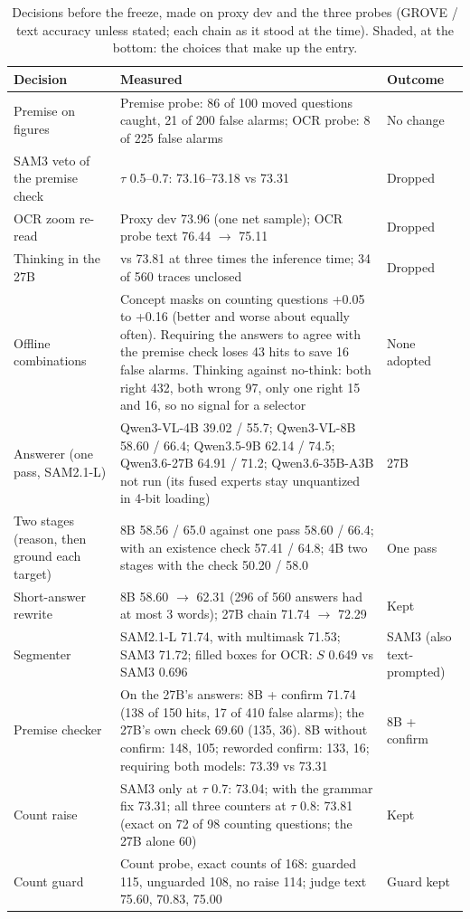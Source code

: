 \documentclass{article}
\newcommand{\ours}{\rowcolor{oursbg}}
\begin{document}
\begin{table}[!htbp]
\centering\scriptsize
\caption{Decisions before the freeze, made on proxy dev and the three probes (GROVE / text accuracy unless stated; each chain as it
stood at the time). Shaded, at the bottom: the choices that make up the entry.}
\label{tab:pre}
\begin{tabular}{@{}>{\raggedright\arraybackslash}p{1.15in}>{\raggedright\arraybackslash}p{3.4in}>{\raggedright\arraybackslash}p{.6in}@{}}
\toprule
Decision & Measured & Outcome \\
\midrule
Premise on figures & Premise probe: 86 of 100 moved questions caught, 21 of 200 false alarms; OCR probe: 8 of 225 false alarms & No change \\
SAM3 veto of the premise check & $\tau$ 0.5--0.7: 73.16--73.18 vs 73.31 & Dropped \\
OCR zoom re-read & Proxy dev 73.96 (one net sample); OCR probe text 76.44 $\to$ 75.11 & Dropped \\
Thinking in the 27B & 73.64 vs 73.81 at three times the inference time; 34 of 560 traces unclosed & Dropped \\
Offline combinations & Concept masks on counting questions +0.05 to +0.16 (better and worse about equally often). Requiring the answers to agree with the premise check loses 43 hits to save 16 false alarms. Thinking against no-think: both right 432, both wrong 97, only one right 15 and 16, so no signal for a selector & None adopted \\
\midrule
\ours Answerer (one pass, SAM2.1-L) & Qwen3-VL-4B 39.02 / 55.7; Qwen3-VL-8B 58.60 / 66.4; Qwen3.5-9B 62.14 / 74.5; Qwen3.6-27B 64.91 / 71.2; Qwen3.6-35B-A3B not run (its fused experts stay unquantized in 4-bit loading) & 27B \\
\ours Two stages (reason, then ground each target) & 8B 58.56 / 65.0 against one pass 58.60 / 66.4; with an existence check 57.41 / 64.8; 4B two stages with the check 50.20 / 58.0 & One pass \\
\ours Short-answer rewrite & 8B 58.60 $\to$ 62.31 (296 of 560 answers had at most 3 words); 27B chain 71.74 $\to$ 72.29 & Kept \\
\ours Segmenter & SAM2.1-L 71.74, with multimask 71.53; SAM3 71.72; filled boxes for OCR: $S$ 0.649 vs SAM3 0.696 & SAM3 (also text-prompted) \\
\ours Premise checker & On the 27B's answers: 8B + confirm 71.74 (138 of 150 hits, 17 of 410 false alarms); the 27B's own check 69.60 (135, 36). 8B without confirm: 148, 105; reworded confirm: 133, 16; requiring both models: 73.39 vs 73.31 & 8B + confirm \\
\ours Count raise & SAM3 only at $\tau$ 0.7: 73.04; with the grammar fix 73.31; all three counters at $\tau$ 0.8: 73.81 (exact on 72 of 98 counting questions; the 27B alone 60) & Kept \\
\ours Count guard & Count probe, exact counts of 168: guarded 115, unguarded 108, no raise 114; judge text 75.60, 70.83, 75.00 & Guard kept \\
\bottomrule
\end{tabular}
\end{table}
\end{document}
